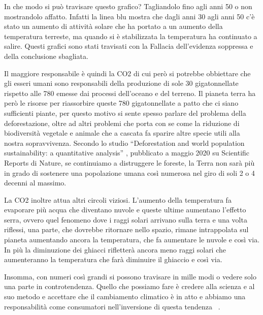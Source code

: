 \documentclass[12pt]{book} %
\begin{document}
In che modo si può travisare questo grafico? Tagliandolo fino agli anni 50 o non mostrandolo affatto. Infatti la linea
blu mostra che dagli anni 30 agli anni 50 c'è stato un aumento di attività solare che ha portato a
un aumento della temperatura terreste, ma quando si è stabilizzata la temperatura ha continuato a salire. Questi
grafici sono stati travisati con la Fallacia dell'evidenza soppressa e della conclusione sbagliata.

Il maggiore responsabile è quindi la CO2 di cui però si potrebbe obbiettare che gli esseri umani sono responsabili della
produzione di sole 30 gigatonnellate rispetto alle 780 emesse dai processi dell'oceano e del
terreno. Il pianeta terra ha però le risorse per riassorbire queste 780 gigatonnellate a patto che ci siano sufficienti
piante, per questo motivo si sente spesso parlare del problema della deforestazione, oltre ad altri problemi che porta
con se come la riduzione di biodiversità vegetale e animale che a cascata fa sparire altre specie utili alla nostra
sopravvivenza. Secondo lo studio “Deforestation and world population sustainability: a quantitative
analysis” , pubblicato a maggio 2020 su Scientific
Reports di Nature, se continuiamo a distruggere le foreste, la Terra non sarà più in grado di sostenere una popolazione
umana così numerosa nel giro di soli 2 o 4 decenni al massimo.

La CO2 inoltre attua altri circoli viziosi. L'aumento della temperatura fa evaporare più acqua che
diventano nuvole e queste ultime aumentano l'effetto serra, ovvero quel fenomeno dove i raggi
solari arrivano sulla terra e una volta riflessi, una parte, che dovrebbe ritornare nello spazio, rimane intrappolata
sul pianeta aumentando ancora la temperatura, che fa aumentare le nuvole e così via. In più la diminuzione dei ghiacci
rifletterà ancora meno raggi solari che aumenteranno la temperatura che farà diminuire il ghiaccio e così via. 

Insomma, con numeri così grandi si possono travisare in mille modi o vedere solo una parte in controtendenza. Quello che
possiamo fare è credere alla scienza e al suo metodo e accettare che il cambiamento climatico è in atto e abbiamo una
responsabilità come consumatori nell'inversione di questa
tendenza
\ .
\end{document}
